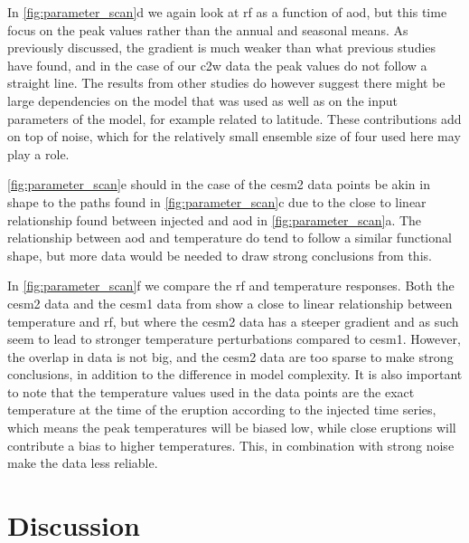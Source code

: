 \documentclass[twocol]{ametsocV6.1}
\newcommand{\iso}[1][i]{{#1}njected \ce{SO2}}
\begin{document}
In \ref{fig:parameter_scan}d we again look at \gls{rf} as a function of \gls{aod}, but this
time focus on the peak values rather than the annual and seasonal means. As previously
discussed, the gradient is much weaker than what previous studies have found, and in the
case of our \gls{c2w} data the peak values do not follow a straight line. The results
from other studies \citep{jones2005, ottobliesner2016, timmreck2010} do however suggest
there might be large dependencies on the model that was used as well as on the input
parameters of the model, for example related to latitude. These contributions add on top
of noise, which for the relatively small ensemble size of four used here may play a
role.

\ref{fig:parameter_scan}e should in the case of the \gls{cesm2} data points be akin in shape
to the paths found in \ref{fig:parameter_scan}c due to the close to linear relationship
found between \iso{} and \gls{aod} in \ref{fig:parameter_scan}a. The relationship between
\gls{aod} and temperature do tend to follow a similar functional shape, but more data
would be needed to draw strong conclusions from this.

In \ref{fig:parameter_scan}f we compare the \gls{rf} and temperature responses. Both the
\gls{cesm2} data and the \gls{cesm1} data from \citet{ottobliesner2016} show a close to
linear relationship between temperature and \gls{rf}, but where the \gls{cesm2} data has
a steeper gradient and as such seem to lead to stronger temperature perturbations
compared to \gls{cesm1}. However, the overlap in data is not big, and the \gls{cesm2}
data are too sparse to make strong conclusions, in addition to the difference in model
complexity. It is also important to note that the temperature values used in the
\citet{ottobliesner2016} data points are the exact temperature at the time of the
eruption according to the \iso{} time series, which means the peak temperatures will be
biased low, while close eruptions will contribute a bias to higher temperatures. This,
in combination with strong noise make the data less reliable.

\section{Discussion}\label{sec:discussion}

\end{document}
